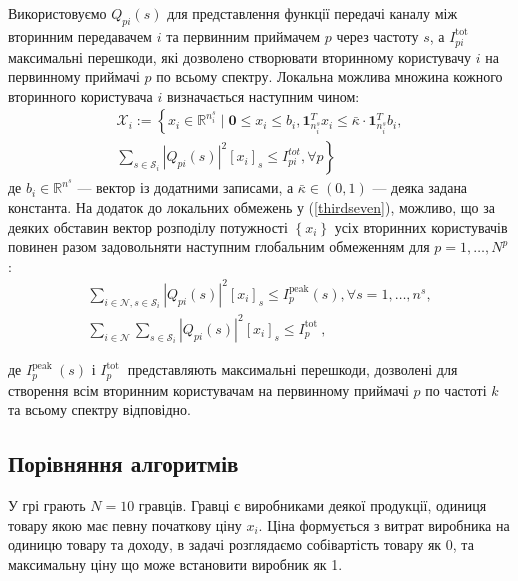 \documentclass[a4paper]{article}
\begin{document}
Використовуємо $Q_{p i}(s)$ для представлення функції передачі каналу між вторинним передавачем $i$ та первинним приймачем $p$ через частоту $s$, а $I_{p i}^{\text {tot }}$ максимальні перешкоди, які дозволено створювати вторинному користувачу $i$ на первинному приймачі $p$ по всьому спектру. Локальна можлива множина кожного вторинного користувача $i$ визначається наступним чином:
\begin{equation}\label{thirdseven}
    \begin{align}
    \mathcal{X}_{i} := \left\{x_{i} \in \mathbb{R}^{n_{i}^{s}} \mid \mathbf{0} \leq x_{i} \leq b_{i}, \mathbf{1}_{n_{i}^{s}}^{T} x_{i} \leq \bar{\kappa} \cdot \mathbf{1}_{n_{ i}^{s}}^{T} b_{i},\right. \\
    \left.\sum_{s \in \mathcal{S}_{i}}\left|Q_{p i}(s)\right|^{2}\left[x_{i}\right]_{s} \leq I_{p i}^{t o t}, \forall p\right\}
    \end{align}
\end{equation}
де $b_{i} \in \mathbb{R}^{n^{s}}$ — вектор із додатними записами, а $\bar{\kappa} \in(0,1)$ — деяка задана константа. На додаток до локальних обмежень у (\ref{thirdseven}), можливо, що за деяких обставин вектор розподілу потужності $\left\{x_{i}\right\}$ усіх вторинних користувачів повинен разом задовольняти наступним глобальним обмеженням для $p = 1, \ldots, N^{p}$:
\begin{equation}
    \begin{aligned}
    \sum_{i \in \mathcal{N}, s \in \mathcal{S}_{i}}\left|Q_{p i}(s)\right|^{2}\left[x_{i}\right]_{s} \leq I_{p}^{\text {peak}}(s), \forall s=1, \ldots, n^{s}, \\
    \sum_{i \in \mathcal{N}} \sum_{s \in \mathcal{S}_{i}}\left|Q_{p i}(s)\right|^{2}\left[x_{i}\right]_{s} \leq I_{p}^{\text {tot }},
    \end{aligned}
\end{equation}

де $I_{p}^{\text {peak }}(s)$ і $I_{p}^{\text {tot }}$ представляють максимальні перешкоди, дозволені для створення всім вторинним користувачам на первинному приймачі $p$ по частоті $k$ та всьому спектру відповідно.

\clearpage
\subsection{Порівняння алгоритмів}

У грі грають $N=10$ гравців. Гравці є виробниками деякої продукції, одиниця товару якою має певну початкову ціну $x_i$. Ціна формується з витрат виробника на одиницю товару та доходу, в задачі розглядаємо собівартість товару як 0, та максимальну ціну що може встановити виробник як 1.
\end{document}
